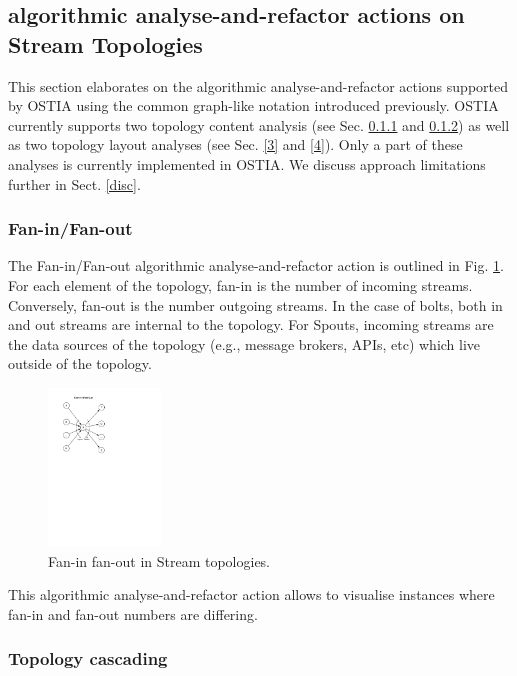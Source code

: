 \subsection{algorithmic analyse-and-refactor actions  on Stream Topologies}\label{algo}

This section elaborates on the algorithmic analyse-and-refactor actions  supported by OSTIA using the common graph-like notation introduced previously. OSTIA currently supports two topology content analysis (see Sec. \ref{1} and \ref{2}) as well as two topology layout analyses (see Sec. \ref{3} and \ref{4}). Only a part of these analyses is currently implemented in OSTIA. We discuss approach limitations further in Sect. \ref{disc}.

\subsubsection{Fan-in/Fan-out}\label{1}

The Fan-in/Fan-out algorithmic analyse-and-refactor action is outlined in Fig. \ref{fig:fan}. For each element of the topology, fan-in is the number of incoming
streams. Conversely, fan-out is the number outgoing streams. In the case of
bolts, both in and out streams are internal to the topology. For Spouts,
incoming streams are the data sources of the topology (e.g., message brokers,
APIs, etc) which live outside of the topology.

\begin{figure}
	\begin{center}
		\includegraphics[width=3cm]{images/fan-in-out}
		\caption{Fan-in fan-out in Stream topologies.}
		\label{fig:fan}
	\end{center}
\end{figure}

This algorithmic analyse-and-refactor action allows to visualise instances where fan-in and fan-out numbers are differing.

\subsubsection{Topology cascading}\label{2}

